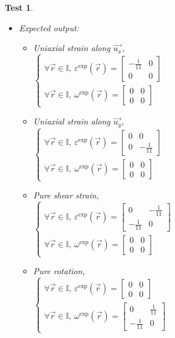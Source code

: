\documentclass[12pt, titlepage]{article}
\newtheorem{Test}{Test}
\begin{document}
\begin{Test}
\begin{itemize}
\begin{itemize}
\end{itemize} 
\item Expected output:
	\begin{itemize}
	\item Uniaxial strain along $\vec{u_x}$,\\
	$\begin{cases} 
	\forall \vec{r} \in \mathbb{I}, \ \varepsilon^{\text{exp}}(\vec{r}) = \begin{bmatrix}
	-\frac{1}{11} & 0 \\
	0 & 0
	\end{bmatrix}  \\
	\forall \vec{r} \in \mathbb{I}, \  \omega^{\text{exp}}(\vec{r}) = \begin{bmatrix}
	0 & 0 \\
	0 & 0 
	\end{bmatrix} 
	\end{cases}$
	\item Uniaxial strain along $\vec{u_y}$,\\
	$\begin{cases} 
	\forall \vec{r} \in \mathbb{I}, \ \varepsilon^{\text{exp}}(\vec{r}) = \begin{bmatrix}
	0 & 0 \\
	0 & -\frac{1}{11}
	\end{bmatrix}  \\
	\forall \vec{r} \in \mathbb{I}, \  \omega^{\text{exp}}(\vec{r}) = \begin{bmatrix}
	0 & 0 \\
	0 & 0 
	\end{bmatrix} 
	\end{cases}$
	\item Pure shear strain,\\
	$\begin{cases} 
	\forall \vec{r} \in \mathbb{I}, \ \varepsilon^{\text{exp}}(\vec{r}) = \begin{bmatrix}
	0 & -\frac{1}{11} \\
	-\frac{1}{11} & 0
	\end{bmatrix}  \\
	\forall \vec{r} \in \mathbb{I}, \  \omega^{\text{exp}}(\vec{r}) = \begin{bmatrix}
	0 & 0 \\
	0 & 0 
	\end{bmatrix} 
	\end{cases}$
	\item Pure rotation,\\
	$\begin{cases} 
	\forall \vec{r} \in \mathbb{I}, \ \varepsilon^{\text{exp}}(\vec{r}) = \begin{bmatrix}
	0 & 0 \\
	0 & 0
	\end{bmatrix}  \\
	\forall \vec{r} \in \mathbb{I}, \  \omega^{\text{exp}}(\vec{r}) = \begin{bmatrix}
	0 & \frac{1}{11} \\
	-\frac{1}{11} & 0 
	\end{bmatrix} 
	\end{cases}$
	\end{itemize}


\end{itemize}
\end{Test}
\end{document}
